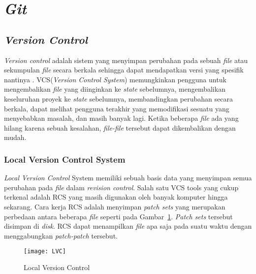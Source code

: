 \section{\textit{Git}}
\label{sec:Git}

\subsection{\textit{Version Control}}
\textit{Version control} adalah sistem yang menyimpan perubahan pada sebuah \textit{file} atau sekumpulan \textit{file} secara berkala sehingga dapat mendapatkan versi yang spesifik nantinya \cite{chacon2014pro}. VCS(\textit{Version Control System}) memungkinkan pengguna untuk mengembalikan \textit{file} yang diinginkan ke \textit{state} sebelumnya, mengembalikan keseluruhan proyek ke \textit{state} sebelumnya, membandingkan perubahan secara berkala, dapat melihat pengguna terakhir yang memodifikasi sesuatu yang menyebabkan masalah, dan masih banyak lagi. Ketika beberapa \textit{file} ada yang hilang karena sebuah kesalahan, \textit{file-file} tersebut dapat dikembalikan dengan mudah. 

\subsubsection{Local Version Control System}
\textit{Local Version Control} System memiliki sebuah basis data yang menyimpan semua perubahan pada \textit{file} dalam \textit{revision control}. Salah satu VCS tools yang cukup terkenal adalah RCS yang masih digunakan oleh banyak komputer hingga sekarang. Cara kerja RCS adalah menyimpan \textit{patch sets} yang merupakan perbedaan antara beberapa \textit{file} seperti pada Gambar~\ref{fig:LVC}. \textit{Patch sets} tersebut disimpan di \textit{disk}. RCS dapat menampilkan \textit{file} apa saja pada suatu waktu dengan menggabungkan \textit{patch-patch} tersebut.  

\begin{figure}[H]
	\centering  
	\texttt{[image: LVC]}  
	\caption[Local Version Control]{Local Version Control}
	\label{fig:LVC} 
\end{figure}

